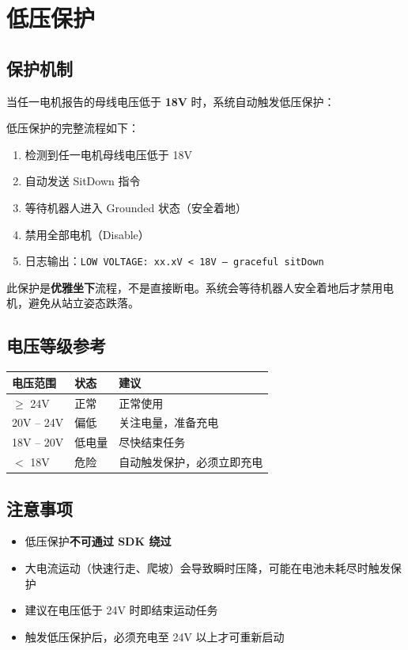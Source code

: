 \documentclass[a4paper,11pt,openany]{book}
\begin{document}
\section{低压保护}

\subsection{保护机制}

当任一电机报告的母线电压低于 \textbf{18V} 时，系统自动触发低压保护：

低压保护的完整流程如下：

\begin{enumerate}[nosep]
  \item 检测到任一电机母线电压低于 18V
  \item 自动发送 SitDown 指令
  \item 等待机器人进入 Grounded 状态（安全着地）
  \item 禁用全部电机（Disable）
  \item 日志输出：\texttt{LOW VOLTAGE: xx.xV < 18V -- graceful sitDown}
\end{enumerate}

此保护是\textbf{优雅坐下}流程，不是直接断电。系统会等待机器人安全着地后才禁用电机，避免从站立姿态跌落。

\subsection{电压等级参考}

\begin{longtable}{lll}
\toprule
电压范围 & 状态 & 建议 \\
\midrule
\endhead
$\geq$ 24V & 正常 & 正常使用 \\
20V -- 24V & 偏低 & 关注电量，准备充电 \\
18V -- 20V & 低电量 & 尽快结束任务 \\
$<$ 18V & 危险 & 自动触发保护，必须立即充电 \\
\bottomrule
\end{longtable}

\subsection{注意事项}

\begin{itemize}[nosep]
  \item 低压保护\textbf{不可通过 SDK 绕过}
  \item 大电流运动（快速行走、爬坡）会导致瞬时压降，可能在电池未耗尽时触发保护
  \item 建议在电压低于 24V 时即结束运动任务
  \item 触发低压保护后，必须充电至 24V 以上才可重新启动
\end{itemize}
\end{document}
